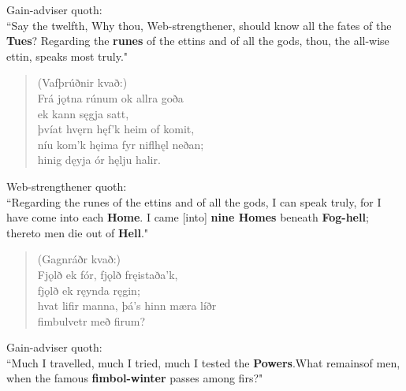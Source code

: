 \bvb Gain-adviser quoth: \\ “Say the twelfth, Why thou, Web-strengthener, should know all the fates of the \textbf{Tues}\footnotemark[73]? Regarding the \textbf{runes} of the ettins and of all the gods, thou, the all-wise ettin, speaks most truly." \\

\begin{verse}
(Vafþrúðnir kvað:) \\%
\bva Frá jǫtna rúnum \hld ok allra goða \\%
\ind ek kann sęgja satt, \\%
þvíat hvęrn hęf'k \hld heim of komit, \\%
níu kom'k hęima \hld fyr niflhęl neðan; \\%
\ind hinig dęyja ór hęlju halir.\\%
\end{verse}

\bvb Web-strengthener quoth: \\ “Regarding the runes of the ettins and of all the gods, I can speak truly, for I have come into each \textbf{Home}. I came [into] \textbf{nine Homes} beneath \textbf{Fog-hell}; thereto men die out of \textbf{Hell}\footnotemark[75]." \\

\begin{verse}
(Gagnráðr kvað:) \\%
\bva Fjǫlð ek fór, \hld fjǫlð fręistaða'k, \\%
\ind fjǫlð ek ręynda ręgin; \\%
hvat lifir manna, \hld þá's hinn mæra líðr \\%
\ind fimbulvetr með firum?\\%
\end{verse}

\bvb Gain-adviser quoth: \\ “Much I travelled, much I tried, much I tested the \textbf{Powers}.\footnotemark[80] What remains\footnotemark[79] of men, when the famous \textbf{fimbol-winter} passes among firs\footnotemark[81]?" \\

